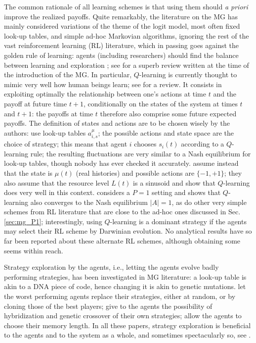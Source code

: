 \documentclass[aps,twocolumn,nofootinbib,sortedaddress,reprint]{revtex4-1}
\begin{document}
The common rationale of all learning schemes is that using them should
{\em a priori} improve the realized payoffs. Quite remarkably, the
literature on the MG has mainly considered variations of the theme
of the logit model, most often fixed  look-up tables, and simple
ad-hoc Markovian algorithms, ignoring the rest of the vast
reinforcement learning (RL) literature, which in passing goes against
the golden rule of learning: agents (including researchers) should
find the balance between learning and exploration
\cite{catteeuw2012heterogeneous}; see
\textcite{sutton1998reinforcement} for a superb review written at the
time of the introduction of the MG. In particular, $Q$-learning is
currently thought to mimic very well how human beings learn;
see \textcite{montague2006imaging} for a review. It consists in exploiting optimally the
relationship between one's actions at time $t$ and the payoff at
future time $t+1$, conditionally on the states of the system at times
$t$ and $t+1$: the payoffs at time $t$ therefore also comprise some
future expected payoffs. The definition of states and actions are to
be chosen wisely by the authors: \textcite{MG-Qlearning} use look-up
tables $a_{i,s}^\mu$; the possible actions and state space are the
choice of strategy; this means that agent $i$ chooses $s_i(t)$ according
to a $Q$-learning rule; the resulting fluctuations are very similar to a
Nash equilibrium for look-up tables, though nobody has ever checked it accurately.
\textcite{catteeuw2012heterogeneous} assume instead that the state is
$\mu(t)$ (real histories) and possible actions are $\{-1,+1\}$; they
also assume that the resource level $L(t)$ is a sinusoid and show that
$Q$-learning does very well in this
context. \textcite{catteeuw2009learning} considers a $P=1$ setting and
shows that $Q$-learning also converges to the Nash equilibrium $|A|=1$,
as do other very simple schemes from RL literature that are close to
the ad-hoc ones discussed in Sec. \ref{sec:mg_P1}; interestingly,
using $Q$-learning is a dominant strategy if the agents may select
their RL scheme by Darwinian evolution. No analytical results have so far been
reported about these alternate RL schemes, although obtaining some
seems within reach.

Strategy exploration by the agents, i.e., letting the agents evolve
badly performing strategies, has been investigated in MG literature: a
look-up table is akin to a DNA piece of code, hence changing it is
akin to genetic mutations. \textcite{CZ98,SavitEv1} let the worst
performing agents replace their strategies, either at random, or by
cloning those of the best players;
\textcite{Sysi-Aho2003a,Sysi-Aho2003b,Sysi-Aho2003c,Sysi-Aho2004a} give
to the agents the possibility of hybridization and genetic crossover of their own strategies; \textcite{CZ97,SavitEv2} allow
the agents to choose their memory length. In all these papers,
strategy exploration is beneficial to the agents and to the system as
a whole, and sometimes spectacularly so,
see \textcite{Sysi-Aho2003a,Sysi-Aho2003b,Sysi-Aho2003c,Sysi-Aho2004a}.
\end{document}
